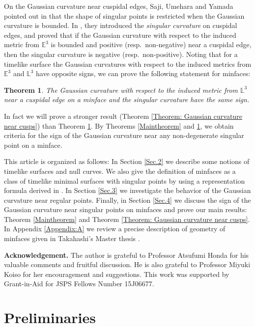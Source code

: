 \documentclass[11pt,reqno]{amsart}
\theoremstyle{plain} %
\newtheorem{theor}{Theorem}
\theoremstyle{definition}
\begin{document}
On the Gaussian curvature near cuspidal edges, Saji, Umehara and Yamada pointed out in \cite{SUY09} that the shape of singular points is restricted when the Gaussian curvature is bounded. In \cite{SUY09}, they introduced the {\it singular curvature} on cuspidal edges, and proved that if the Gaussian curvature with respect to the induced metric from $\mathbb{E}^3$ is bounded and positive (resp.\ non-negative) near a cuspidal edge, then the singular curvature is negative (resp.\ non-positive). Noting that for a timelike surface the Gaussian curvatures with respect to the induced metrics from $\mathbb{E}^3$ and $\mathbb{L}^3$ have opposite signs, we can prove the following statement for minfaces:
\begin{theor}\label{Maintheorem2}
The Gaussian curvature with respect to the induced metric from $\mathbb{L}^3$ near a cuspidal edge on a minface and the singular curvature have the same sign. 
\end{theor}
In fact we will prove a stronger result (Theorem \ref{Theorem: Gaussian curvature near cusps}) than Theorem \ref{Maintheorem2}.
By Theorems \ref{Maintheorem} and \ref{Maintheorem2}, we obtain criteria for the sign of the Gaussian curvature near any non-degenerate singular point on a minface.

This article is organized as follows: In Section \ref{Sec.2} we describe some notions of timelike surfaces and null curves. We also give the definition of minfaces as a class of timelike minimal surfaces with singular points by using a representation formula derived in \cite{T}. In Section \ref{Sec.3} we investigate the behavior of the Gaussian curvature near regular points. Finally, in Section \ref{Sec.4} we discuss the sign of the Gaussian curvature near singular points on minfaces and prove our main results: Theorem \ref{Maintheorem} and Theorem \ref{Theorem: Gaussian curvature near cusps}. In Appendix \ref{Appendix:A} we review a precise description of geometry of minfaces given in Takahashi's Master thesis \cite{T}.

\textbf{Acknowledgement.} The author is grateful to Professor Atsufumi Honda for his valuable comments and fruitful discussion. He is also grateful to Professor Miyuki Koiso for her encouragement and suggestions. This work was supported by Grant-in-Aid for JSPS Fellows Number 15J06677.

\section{Preliminaries\label{Sec.2}}
\end{document}
